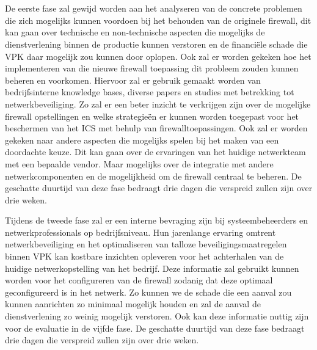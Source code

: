 \chapter{}%
\label{ch:methodologie}

De eerste fase zal gewijd worden aan het analyseren van de concrete problemen die zich mogelijks kunnen voordoen bij het behouden van de originele firewall, dit kan gaan over technische en non-technische aspecten die mogelijks de dienstverlening binnen de productie kunnen verstoren en de financiële schade die VPK daar mogelijk zou kunnen door oplopen. Ook zal er worden gekeken hoe het implementeren van die nieuwe firewall toepassing dit probleem zouden kunnen beheren en voorkomen. Hiervoor zal er gebruik gemaakt worden van bedrijfsinterne knowledge bases, diverse papers en studies met betrekking tot netwerkbeveiliging. Zo zal er een beter inzicht te verkrijgen zijn over de mogelijke firewall opstellingen en welke strategieën er kunnen worden toegepast voor het beschermen van het ICS met behulp van firewalltoepassingen. Ook zal er worden gekeken naar andere aspecten die mogelijks spelen bij het maken van een doordachte keuze. Dit kan gaan over de ervaringen van het huidige netwerkteam met een bepaalde vendor. Maar mogelijks over de integratie met andere netwerkcomponenten en de mogelijkheid om de firewall centraal te beheren. De geschatte duurtijd van deze fase bedraagt drie dagen die verspreid zullen zijn over drie weken.

\vspace{5mm}
Tijdens de tweede fase zal er een interne bevraging zijn bij systeembeheerders en netwerkprofessionals op bedrijfsniveau. Hun jarenlange ervaring omtrent netwerkbeveiliging en het optimaliseren van talloze beveiligingsmaatregelen binnen VPK kan kostbare inzichten opleveren voor het achterhalen van de huidige netwerkopstelling van het bedrijf. Deze informatie zal gebruikt kunnen worden voor het configureren van de firewall zodanig dat deze optimaal geconfigureerd is in het netwerk. Zo kunnen we de schade die een aanval zou kunnen aanrichten zo minimaal mogelijk houden en zal de aanval de dienstverlening zo weinig mogelijk verstoren. Ook kan deze informatie nuttig zijn voor de evaluatie in de vijfde fase. De geschatte duurtijd van deze fase bedraagt drie dagen die verspreid zullen zijn over drie weken.

